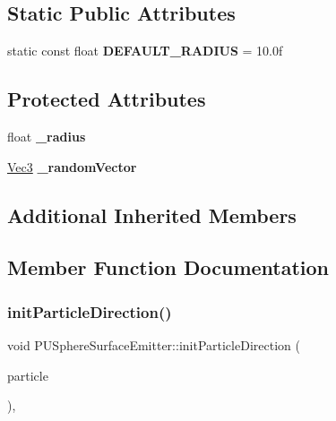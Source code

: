 \subsection*{Static Public Attributes}
\begin{DoxyCompactItemize}
\item 
\mbox{\label{classPUSphereSurfaceEmitter_a64ebfed0b8fdc40f7b16b68bf7a757ab}} 
static const float {\bfseries D\+E\+F\+A\+U\+L\+T\+\_\+\+R\+A\+D\+I\+US} = 10.\+0f
\end{DoxyCompactItemize}
\subsection*{Protected Attributes}
\begin{DoxyCompactItemize}
\item 
\mbox{\label{classPUSphereSurfaceEmitter_aad5235abf50354e190291e0d131050ac}} 
float {\bfseries \+\_\+radius}
\item 
\mbox{\label{classPUSphereSurfaceEmitter_a058fe410682e99d189cb94631ea3a9a2}} 
\hyperlink{classVec3}{Vec3} {\bfseries \+\_\+random\+Vector}
\end{DoxyCompactItemize}
\subsection*{Additional Inherited Members}


\subsection{Member Function Documentation}
\mbox{\label{classPUSphereSurfaceEmitter_aec51594f52f1d4cbeef45f0fc64752db}} 
\subsubsection{\texorpdfstring{init\+Particle\+Direction()}{initParticleDirection()}\hspace{0.1cm}{\footnotesize\ttfamily [1/2]}}
{\footnotesize\ttfamily void P\+U\+Sphere\+Surface\+Emitter\+::init\+Particle\+Direction (\begin{DoxyParamCaption}\item[{\hyperlink{structPUParticle3D}{P\+U\+Particle3D} $\ast$}]{particle }\end{DoxyParamCaption})\hspace{0.3cm}{\ttfamily [override]}, {\ttfamily [virtual]}}

